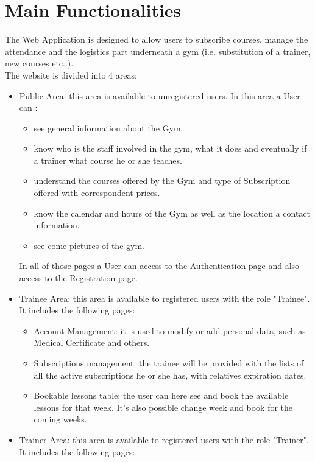 \section{Main Functionalities}

The Web Application is designed to allow users to subscribe courses, manage the attendance and the logistics part underneath a gym (i.e. substitution of a trainer, new courses etc..).\\
The website is divided into 4 areas:

\begin{itemize}
	\item Public Area: this area is available to unregistered users. In this area a User can :
	\begin{itemize}
		\item see general information about the Gym.
		\item know who is the staff involved in the gym, what it does and eventually if a trainer what course he or she teaches.
		\item understand the courses offered by the Gym and type of Subscription offered with correspondent prices.
		\item know the calendar and hours of the Gym as well as the location a contact information.
		\item see come pictures of the gym.
	\end{itemize}	 
	In all of those pages a User can access to the Authentication page and also access to the Registration page. 
	\item Trainee Area: this area is available to registered users with the role "Trainee". It includes the following pages:
	\begin{itemize}
		\item Account Management: it is used to modify or add personal data, such as Medical Certificate and others.
		\item Subscriptions management: the trainee will be provided with the lists of all the active subscriptions he or she has, with relatives expiration dates.
		\item Bookable lessons table: the user can here see and book the available lessons for that week. It's also possible change week and book for the coming weeks.
	\end{itemize}
	\item Trainer Area: this area is available to registered users with the role "Trainer". It includes the following pages:

\end{itemize}
